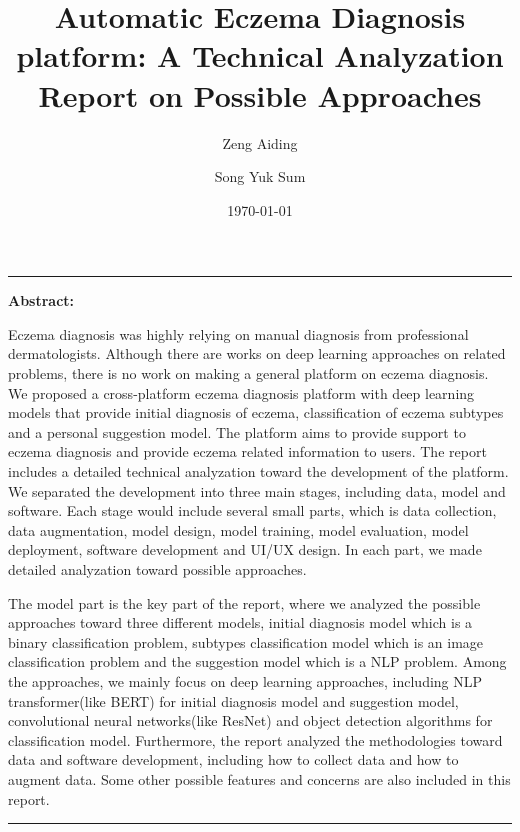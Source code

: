 \documentclass[12pt, a4paper]{article}
\title{Automatic Eczema Diagnosis platform: A Technical Analyzation Report on Possible Approaches}
\author[1]{Zeng Aiding}
\author[2]{Song Yuk Sum}
\affil[1]{dingandy388@gmail.com}
\affil[2]{s2021084@stu.ssc.edu.hk; The author has significant contribution in the set-up stage investigation and research.}
\date{\today}
\renewenvironment{abstract}{\small\noindent\ignorespaces}{\par\noindent\rule{\textwidth}{0.4pt}}
\begin{document}
\maketitle

\noindent\rule{\textwidth}{0.4pt}

\begin{abstract}
  \noindent\textbf{Abstract:} 
  
  Eczema diagnosis was highly relying on manual diagnosis from professional dermatologists. Although there are works on deep learning approaches on related problems, there is no work on making a general platform on eczema diagnosis. We proposed a cross-platform eczema diagnosis platform with deep learning models that provide initial diagnosis of eczema, classification of eczema subtypes and a personal suggestion model. The platform aims to provide support to eczema diagnosis and provide eczema related information to users. The report includes a detailed technical analyzation toward the development of the platform. We separated the development into three main stages, including data, model and software. Each stage would include several small parts, which is data collection, data augmentation, model design, model training, model evaluation, model deployment, software development and UI/UX design. In each part, we made detailed analyzation toward possible approaches.

  The model part is the key part of the report, where we analyzed the possible approaches toward three different models, initial diagnosis model which is a binary classification problem, subtypes classification model which is an image classification problem and the suggestion model which is a NLP problem. Among the approaches, we mainly focus on deep learning approaches, including NLP transformer(like BERT) for initial diagnosis model and suggestion model, convolutional neural networks(like ResNet) and object detection algorithms for classification model. Furthermore, the report analyzed the methodologies toward data and software development, including how to collect data and how to augment data. Some other possible features and concerns are also included in this report.
\end{abstract}

\vspace{2em} %

\begin{multicols}{2}






\end{multicols}


\end{document}
